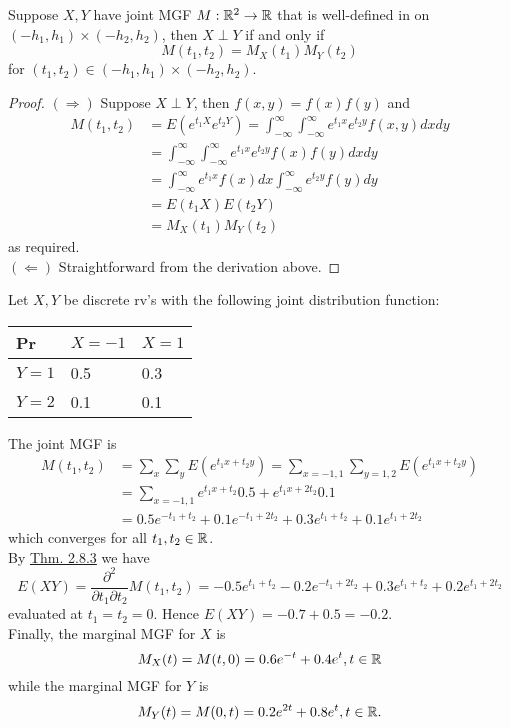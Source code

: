 \documentclass[11pt,fleqn]{book} %
\begin{document}
\begin{theorem} \label{thm:284}
Suppose \(X, Y\) have joint MGF \(M: \mathbb{R}^2\rightarrow\mathbb{R}\) that is well-defined in on \((-h_1, h_1) \times (-h_2, h_2)\), then \(X\perp Y\) if and only if
\[
M(t_1, t_2) = M_X(t_1)M_Y(t_2)
\]
for \((t_1, t_2) \in (-h_1, h_1) \times (-h_2, h_2)\).
\end{theorem}
\begin{proof} \((\Rightarrow)\) Suppose \(X \perp Y\), then \(f(x, y) = f(x)f(y)\) and
\[
\begin{aligned}
M(t_1, t_2) &= E(e^{t_1X}e^{t_2Y}) = \int_{-\infty}^\infty\int_{-\infty}^\infty e^{t_1x}e^{t_2y} f(x, y)dxdy \\
&= \int_{-\infty}^\infty\int_{-\infty}^\infty e^{t_1x}e^{t_2y}f(x)f(y)dxdy \\
&= \int_{-\infty}^\infty e^{t_1x}f(x)dx \int_{-\infty}^\infty e^{t_2y}f(y)dy \\
&= E(t_1X)E(t_2Y) \\
&= M_X(t_1)M_Y(t_2)
\end{aligned}
\]
as required. \\
\indent \((\Leftarrow)\) Straightforward from the derivation above.
\end{proof}

\begin{example} Let \(X, Y\) be discrete rv's with the following joint distribution function:
\begin{table}[h]
\centering
\begin{tabular}{l l l}
\toprule
Pr & \(X = -1\) & \(X = 1\)\\
\midrule
\(Y = 1\) & 0.5 & 0.3 \\
\(Y = 2\) & 0.1 & 0.1 \\
\bottomrule
\end{tabular}
\end{table}

\indent The joint MGF is
\[
\begin{aligned}
M(t_1, t_2) &= \sum_x\sum_y E(e^{t_1x+t_2y}) = \sum_{x = -1, 1}\sum_{y = 1, 2} E(e^{t_1x+t_2y}) \\
&= \sum_{x = -1, 1} e^{t_1x+t_2} 0.5 + e^{t_1x+2t_2}0.1 \\
&= 0.5e^{-t_1 + t_2} + 0.1e^{-t_1 + 2t_2} + 0.3e^{t_1 + t_2} + 0.1e^{t_1 + 2t_2}
\end{aligned}
\]
which converges for all \(t_1, t_2 \in \mathbb{R}\).\\
\indent By \hyperref[thm:283]{Thm. 2.8.3} we have
\[
E(XY) = \frac{\partial^2}{\partial t_1 \partial t_2} M(t_1, t_2) = -0.5e^{t_1 + t_2} - 0.2e^{-t_1 + 2t_2} + 0.3e^{t_1 + t_2} + 0.2e^{t_1 + 2t_2}
\]
evaluated at \(t_1 = t_2 = 0\). Hence \(E(XY) = -0.7 + 0.5 = -0.2\). \\
\indent Finally, the marginal MGF for \(X\) is
\[
M_X(t) = M(t, 0) = 0.6e^{-t} + 0.4e^{t}, t \in \mathbb{R}
\]
while the marginal MGF for \(Y\) is
\[
M_Y(t) = M(0, t) = 0.2e^{2t} + 0.8e^{t}, t \in \mathbb{R}.
\]
\end{example} 
\end{document}

